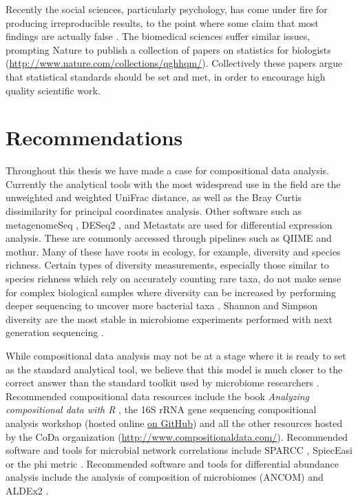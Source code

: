 Recently the social sciences, particularly psychology, has come under fire for producing irreproducible results, to the point where some claim that most findings are actually false \cite{ioannidis2005most}. The biomedical sciences suffer similar issues, prompting Nature to publish a collection of papers on statistics for biologists (\url{http://www.nature.com/collections/qghhqm/}). Collectively these papers argue that statistical standards should be set and met, in order to encourage high quality scientific work.

\section{Recommendations}
Throughout this thesis we have made a case for compositional data analysis. Currently the analytical tools with the most widespread use in the field are the unweighted and weighted UniFrac distance, as well as the Bray Curtis dissimilarity for principal coordinates analysis. Other software such as metagenomeSeq \cite{paulson2014metagenomeseq}, DESeq2 \cite{love2014moderated}, and Metastats \cite{paulson2011metastats} are used for differential expression analysis. These are commonly accessed through pipelines such as QIIME and mothur. Many of these have roots in ecology, for example, diversity and species richness. Certain types of diversity measurements, especially those similar to species richness which rely on accurately counting rare taxa, do not make sense for complex biological samples where diversity can be increased by performing deeper sequencing to uncover more bacterial taxa \cite{haegeman2013robust}. Shannon and Simpson diversity are the most stable in microbiome experiments performed with next generation sequencing \cite{haegeman2013robust}.

While compositional data analysis may not be at a stage where it is ready to set as the standard analytical tool, we believe that this model is much closer to the correct answer than the standard toolkit used by microbiome researchers \cite{gloor2016s} \cite{gloor2016compositional} \cite{fernandes2013anova} \cite{fernandes2014unifying}. Recommended compositional data resources include the book \textit{Analyzing compositional data with R} \cite{van2013analyzing}, the 16S rRNA gene sequencing compositional analysis workshop (hosted online \href{https://github.com/ggloor/compositions/blob/master/background_reading/CJM_supplement/workshop.pdf}{on GitHub}) and all the other resources hosted by the CoDa organization (\url{http://www.compositionaldata.com/}). Recommended software and tools for microbial network correlations include SPARCC \cite{friedman2012inferring}, SpiecEasi \cite{kurtz2015sparse} or the phi metric \cite{lovell2015proportionality}. Recommended software and tools for differential abundance analysis include the analysis of composition of microbiomes (ANCOM) \cite{mandal2015analysis} and ALDEx2 \cite{fernandes2014unifying}.

